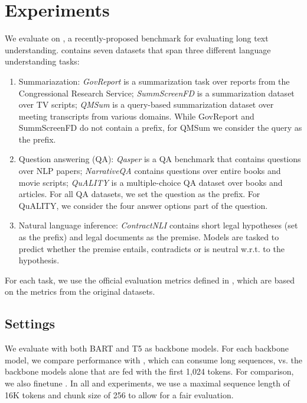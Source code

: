 \section{Experiments}
\label{sec:experiemnts}

We evaluate \sled{} on \SCROLLS{} \cite{Shaham2022SCROLLSSC}, a recently-proposed benchmark for evaluating long text understanding.
\SCROLLS{} contains seven datasets that span three different language understanding tasks:
\begin{enumerate}
    \item Summariazation: \emph{GovReport} \cite{huang2021govreport} is a summarization task over reports from the Congressional Research Service; \emph{SummScreenFD} \cite{chen2021summscreen} is a summarization dataset over TV scripts; \emph{QMSum} \cite{zhong2021qmsum} is a query-based summarization dataset over meeting transcripts from various domains. While GovReport and SummScreenFD do not contain a prefix, for QMSum we consider the query as the prefix.
    \item Question answering (QA): \emph{Qasper} \cite{dasigi2021qasper} is a QA benchmark that contains questions over NLP papers; \emph{NarrativeQA} \cite{kocisky2018narrativeqa}
    contains questions over entire books and movie scripts; \emph{QuALITY} \cite{pang2021quality} is a multiple-choice QA dataset over books and articles.
    For all QA datasets, we set the question as the prefix. For QuALITY, we consider the four answer options part of the question.
    \item Natural language inference: \emph{ContractNLI} \cite{koreeda-manning-2021-contractnli-dataset} contains short legal hypotheses (set as the prefix) and legal documents as the premise. Models are tasked to predict whether the premise entails, contradicts or is neutral w.r.t. to the hypothesis.
\end{enumerate}

For each task, we use the official evaluation metrics defined in \SCROLLS{}, which are based on the metrics from the original datasets.

\subsection{Settings}

We evaluate \sled{} with both BART \cite{Lewis2020BARTDS} and T5 \cite{Raffel2020ExploringTL} as backbone models.
For each backbone model, we compare performance with \sled{}, which can consume long sequences, vs. the backbone models alone that are fed with the first 1,024 tokens. For comparison, we also finetune \ledbase{}. In all \sled{} and \led{} experiments, we use a maximal sequence length of 16K tokens and chunk size of 256 to allow for a fair evaluation.

